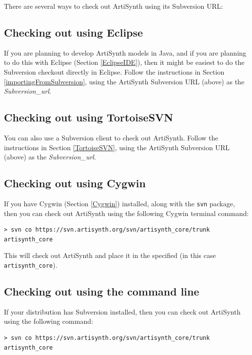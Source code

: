 There are several ways to check out ArtiSynth using its Subversion URL:

\subsection{Checking out using Eclipse}
\label{ArtiSynthEclipseCheckout}

If you are planning to develop ArtiSynth models in Java, and if you
are planning to do this with Eclipse (Section \ref{EclipseIDE}), then
it might be easiest to do the Subversion checkout directly in Eclipse.
Follow the instructions in Section \ref{importingFromSubversion},
using the ArtiSynth Subversion URL (above) as the {\it
Subversion\_url}.

\ifWindows
\subsection{Checking out using TortoiseSVN}
\label{TortoiseSVNCheckout}

You can also use a Subversion client to check out ArtiSynth. Follow
the instructions in Section \ref{TortoiseSVN}, using the ArtiSynth
Subversion URL (above) as the {\it Subversion\_url}.

\subsection{Checking out using Cygwin}
\label{ArtiSynthCygwinCheckout}

If you have Cygwin (Section \ref{Cygwin}) installed, along
with the {\tt svn} package, then you can check out ArtiSynth using the
following Cygwin terminal command:

\begin{lstlisting}
> svn co https://svn.artisynth.org/svn/artisynth_core/trunk artisynth_core
\end{lstlisting}

This will check out ArtiSynth and place it in the specified \directory 
(in this case {\tt artisynth\_core}).
\else
\subsection{Checking out using the command line}
\label{ArtiSynthCygwinCheckout}

If your \SYSTEM distribution has Subversion installed, then you can
check out ArtiSynth using the following command:

\begin{lstlisting}
> svn co https://svn.artisynth.org/svn/artisynth_core/trunk artisynth_core
\end{lstlisting}

